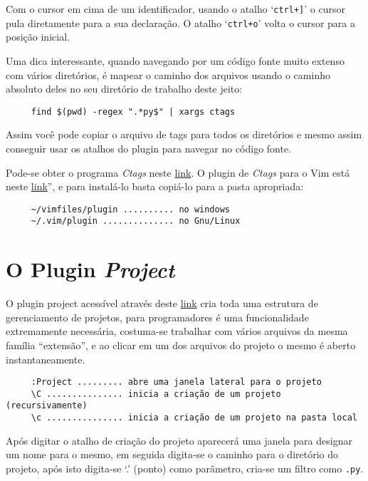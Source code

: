 Com o cursor em cima de um identificador, usando o atalho `\verb|ctrl+]|' o cursor pula diretamente 
para a sua declaração. O atalho `\verb|ctrl+o|' volta o cursor para a posição inicial.

Uma dica interessante, quando navegando por um código fonte muito extenso com vários diretórios, 
é mapear o caminho dos arquivos usando o caminho absoluto deles no seu diretório de trabalho 
deste jeito:

\begin{verbatim}
     find $(pwd) -regex ".*py$" | xargs ctags
\end{verbatim}

Assim você pode copiar o arquivo de tags para todos os diretórios e mesmo assim conseguir usar 
os atalhos do plugin para navegar no código fonte.

Pode-se obter o programa {\em Ctags} neste
\href{http://ctags.sourceforge.net/}{link}. O plugin de {\em Ctags} para o Vim está neste 
\href{http://vim.sourceforge.net/scripts/script.php?script\_id=12}{link}'', 
e para instalá-lo basta copiá-lo para a pasta apropriada:
    
\begin{verbatim}
     ~/vimfiles/plugin .......... no windows
     ~/.vim/plugin .............. no Gnu/Linux
\end{verbatim}


\section{O Plugin {\em Project}}

O plugin project acessível através deste \href{http://www.vim.org/scripts/script.php?script\_id=69}{link}
cria toda uma estrutura de gerenciamento de projetos, para programadores é uma funcionalidade
extremamente necessária, costuma-se trabalhar com vários arquivos da mesma família ``extensão'', 
e ao clicar em um dos arquivos do projeto o mesmo é aberto instantaneamente.

\begin{verbatim}
     :Project ......... abre uma janela lateral para o projeto
     \C ............... inicia a criação de um projeto (recursivamente)
     \c ............... inicia a criação de um projeto na pasta local
\end{verbatim}

Após digitar o atalho de criação do projeto aparecerá uma janela para designar um nome
para o mesmo, em seguida digita-se o caminho para o diretório do projeto, após isto
digita-se `.' (ponto) como parâmetro, cria-se um filtro como {\tt *.py}.


